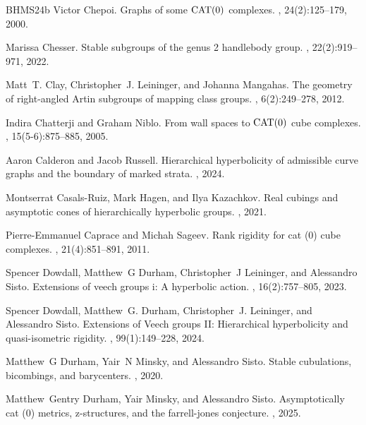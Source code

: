 \documentclass{amsart}
\theoremstyle{definition}
\theoremstyle{remark}
\theoremstyle{definition}
\begin{document}
\begin{thebibliography}{BHMS24b}
Victor Chepoi.
\newblock Graphs of some {${\rm CAT}(0)$} complexes.
, 24(2):125--179, 2000.

Marissa Chesser.
\newblock Stable subgroups of the genus 2 handlebody group.
, 22(2):919--971, 2022.

Matt~T. Clay, Christopher~J. Leininger, and Johanna Mangahas.
\newblock The geometry of right-angled {A}rtin subgroups of mapping class
  groups.
, 6(2):249--278, 2012.

Indira Chatterji and Graham Niblo.
\newblock From wall spaces to {$\rm CAT(0)$} cube complexes.
, 15(5-6):875--885, 2005.

Aaron Calderon and Jacob Russell.
\newblock Hierarchical hyperbolicity of admissible curve graphs and the
  boundary of marked strata.
, 2024.

Montserrat Casals-Ruiz, Mark Hagen, and Ilya Kazachkov.
\newblock Real cubings and asymptotic cones of hierarchically hyperbolic
  groups.
, 2021.

Pierre-Emmanuel Caprace and Michah Sageev.
\newblock Rank rigidity for cat (0) cube complexes.
, 21(4):851--891, 2011.

Spencer Dowdall, Matthew~G Durham, Christopher~J Leininger, and Alessandro
  Sisto.
\newblock Extensions of veech groups i: A hyperbolic action.
, 16(2):757--805, 2023.

Spencer Dowdall, Matthew~G. Durham, Christopher~J. Leininger, and Alessandro
  Sisto.
\newblock Extensions of {V}eech groups {II}: {H}ierarchical hyperbolicity and
  quasi-isometric rigidity.
, 99(1):149--228, 2024.

Matthew~G Durham, Yair~N Minsky, and Alessandro Sisto.
\newblock Stable cubulations, bicombings, and barycenters.
, 2020.

Matthew~Gentry Durham, Yair Minsky, and Alessandro Sisto.
\newblock Asymptotically cat (0) metrics, z-structures, and the farrell-jones
  conjecture.
, 2025.


\end{thebibliography}
\end{document}
